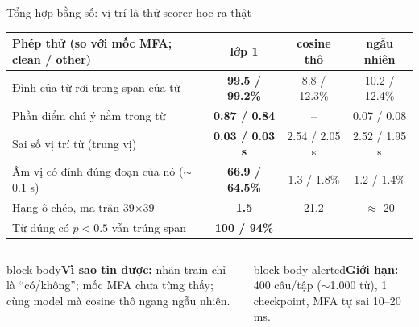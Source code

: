 \documentclass[aspectratio=169,xcolor=table]{beamer}
\newcommand{\good}[1]{\textcolor{GoodGreen}{\textbf{#1}}}
\newcommand{\nbox}[2][block body]{\begin{beamercolorbox}[sep=0.45em,rounded=true]{#1}\footnotesize #2\end{beamercolorbox}}
\begin{document}
\begin{frame}{Tổng hợp bằng số: vị trí là thứ scorer học ra thật}
\centering\small\setlength{\tabcolsep}{5pt}
\begin{tabular}{L{6.4cm}ccc}
\toprule
Phép thử (so với mốc MFA; clean / other) & \textbf{lớp 1} & cosine thô & ngẫu nhiên\\
\midrule
Đỉnh của từ rơi trong span của từ & \good{99.5 / 99.2\%} & 8.8 / 12.3\% & 10.2 / 12.4\%\\
Phần điểm chú ý nằm trong từ & \good{0.87 / 0.84} & -- & 0.07 / 0.08\\
Sai số vị trí từ (trung vị) & \good{0.03 / 0.03 s} & 2.54 / 2.05 s & 2.52 / 1.95 s\\
Âm vị có đỉnh đúng đoạn của nó ($\sim$0.1 s) & \good{66.9 / 64.5\%} & 1.3 / 1.8\% & 1.2 / 1.4\%\\
Hạng ô chéo, ma trận 39$\times$39 & \good{1.5} & 21.2 & $\approx$ 20\\
Từ đúng có $p<0.5$ vẫn trúng span & \good{100 / 94\%} & & \\
\bottomrule
\end{tabular}\par
\vspace{0.3cm}\raggedright
\begin{columns}[T]
\begin{column}{0.48\textwidth}
\nbox{\textbf{Vì sao tin được:} nhãn train chỉ là ``có/không''; mốc MFA chưa từng thấy; cùng model mà cosine thô ngang ngẫu nhiên.}
\end{column}
\begin{column}{0.48\textwidth}
\nbox[block body alerted]{\textbf{Giới hạn:} 400 câu/tập ($\sim$1.000 từ), 1 checkpoint, MFA tự sai 10--20 ms.}
\end{column}
\end{columns}
\end{frame}
\end{document}
